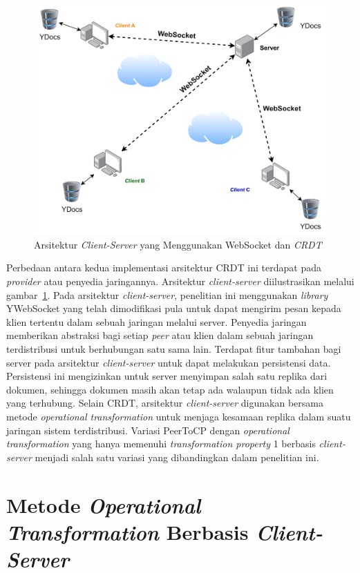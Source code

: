 \begin{figure}
    \centering
    \includegraphics[scale=0.65]{assets/skripsi/Arsitektur_WebSocket_CRDT}
    \caption{Arsitektur \textit{Client-Server} yang Menggunakan WebSocket dan \textit{CRDT}}
    \label{crdt-cs}
\end{figure}

Perbedaan antara kedua implementasi arsitektur CRDT ini terdapat pada \textit{provider} atau penyedia jaringannya. Arsitektur \textit{client-server} diilustrasikan melalui gambar~\ref{crdt-cs}. Pada arsitektur \textit{client-server}, penelitian ini menggunakan \textit{library} YWebSocket yang telah dimodifikasi pula untuk dapat mengirim pesan kepada klien tertentu dalam sebuah jaringan melalui server. Penyedia jaringan memberikan abstraksi bagi setiap \textit{peer} atau klien dalam sebuah jaringan terdistribusi untuk berhubungan satu sama lain. Terdapat fitur tambahan bagi server pada arsitektur \textit{client-server} untuk dapat melakukan persistensi data. Persistensi ini mengizinkan untuk server menyimpan salah satu replika dari dokumen, sehingga dokumen masih akan tetap ada walaupun tidak ada klien yang terhubung. Selain CRDT, arsitektur \textit{client-server} digunakan bersama metode \textit{operational transformation} untuk menjaga kesamaan replika dalam suatu jaringan sistem terdistribusi. Variasi PeerToCP dengan \textit{operational transformation} yang hanya memenuhi \textit{transformation property} 1 berbasis \textit{client-server} menjadi salah satu variasi yang dibandingkan dalam penelitian ini.

\section{Metode \textit{Operational Transformation} Berbasis \textit{Client-Server}}
\label{sec:design_ot}

